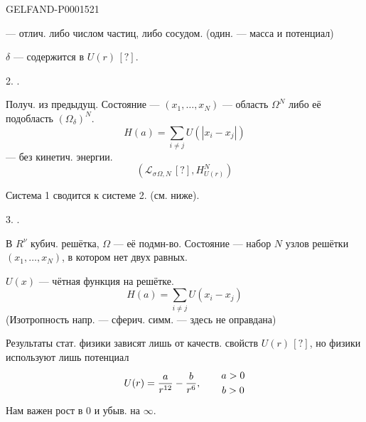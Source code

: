 \begin{GelfandAdjacentEvidence}{GELFAND-P000152}{1}
\hfill{}

 — отлич. либо числом частиц, либо сосудом.
(один. — масса и потенциал)

$\delta$ — содержится в $U(r)\,[?]$.


2. .

Получ. из предыдущ.
Состояние — $(x_1,\ldots,x_N)$ — область $\Omega^N$ либо её
подобласть $(\Omega_\delta)^N$.
\begin{equation*}
H(a)=\sum_{i\ne j}U(|x_i-x_j|)
\end{equation*}
— без кинетич. энергии.
\begin{equation*}
(\mathcal L_\sigma{}_{\Omega,N}\,[?],H^N_{U(r)})
\end{equation*}
\end{GelfandAdjacentEvidence}

Система 1 сводится к системе 2. (см. ниже).


\par\noindent\begin{minipage}[t]{\linewidth}
3. .

В $R^\nu$ кубич. решётка, $\Omega$ — её подмн-во.
Состояние — набор $N$ узлов решётки $(x_1,\ldots,x_N)$,
в котором нет двух равных.
\end{minipage}\par

$U(x)$ — чётная функция на решётке.
\begin{equation*}
H(a)=\sum_{i\ne j}U(x_i-x_j)
\end{equation*}
(Изотропность напр. — сферич. симм. — здесь не оправдана)


Результаты стат. физики зависят лишь от качеств.
свойств $U(r)\,[?]$, но физики используют лишь потенциал
\begin{equation*}
U(r)=\frac a{r^{12}}-\frac b{r^6},\qquad
\begin{gathered}a>0\mathstrut\\ b>0\end{gathered}
\end{equation*}
Нам важен рост в $0$ и убыв. на $\infty$.

